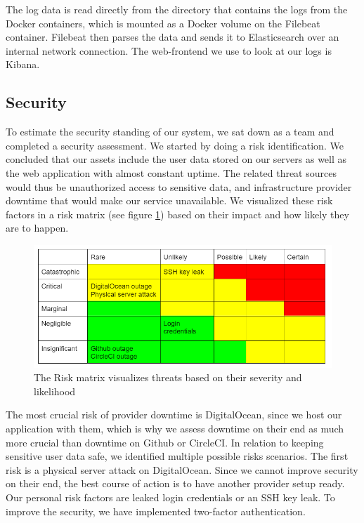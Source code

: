 The log data is read directly from the directory that contains the logs from the Docker containers, which is mounted as a Docker volume on the Filebeat container. Filebeat then parses the data and sends it to Elasticsearch over an internal network connection. The web-frontend we use to look at our logs is Kibana.




\subsection{Security}
To estimate the security standing of our system, we sat down as a team and completed a security assessment. We started by doing a risk identification. We concluded that our assets include the user data stored on our servers as well as the web application with almost constant uptime. The related threat sources would thus be unauthorized access to sensitive data, and infrastructure provider downtime that would make our service unavailable. We visualized these risk factors in a risk matrix (see figure \ref{fig:Risk_matrix}) based on their impact and how likely they are to happen.

\begin{figure}[H]
    \centering
    \includegraphics[scale=0.85]{images/risk_matrix.png}
    \caption{The Risk matrix visualizes threats based on their severity and likelihood}
    \label{fig:Risk_matrix}
\end{figure}

The most crucial risk of provider downtime is DigitalOcean, since we host our application with them, which is why we assess downtime on their end as much more crucial than downtime on Github or CircleCI.
\newline
In relation to keeping sensitive user data safe, we identified multiple possible risks scenarios.
The first risk is a physical server attack on DigitalOcean. Since we cannot improve security on their end, the best course of action is to have another provider setup ready. Our personal risk factors are leaked login credentials or an SSH key leak. To improve the security, we have implemented two-factor authentication.


